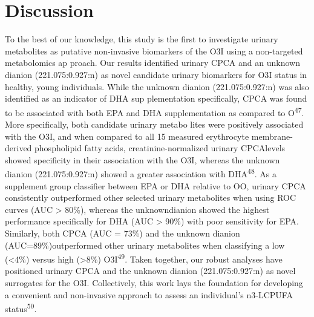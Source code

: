\documentclass[journal=jacsat,manuscript=article]{achemso}
\begin{document}
\section{Discussion}\label{discussion}

To the best of our knowledge, this study is the first to investigate
urinary metabolites as putative non-invasive biomarkers of the O3I using
a non-targeted metabolomics ap proach. Our results identified urinary
CPCA and an unknown dianion (221.075:0.927:n) as novel candidate urinary
biomarkers for O3I status in healthy, young individuals. While the
unknown dianion (221.075:0.927:n) was also identified as an indicator of
DHA sup plementation specifically, CPCA was found to be associated with
both EPA and DHA supplementation as compared to O\textsuperscript{47}.
More specifically, both candidate urinary metabo lites were positively
associated with the O3I, and when compared to all 15 measured
erythrocyte membrane-derived phospholipid fatty acids,
creatinine-normalized urinary CPCAlevels showed specificity in their
association with the O3I, whereas the unknown dianion (221.075:0.927:n)
showed a greater association with DHA\textsuperscript{48}. As a
supplement group classifier between EPA or DHA relative to OO, urinary
CPCA consistently outperformed other selected urinary metabolites when
using ROC curves (AUC \textgreater{} 80\%), whereas the unknowndianion
showed the highest performance specifically for DHA (AUC \textgreater{}
90\%) with poor sensitivity for EPA. Similarly, both CPCA (AUC = 73\%)
and the unknown dianion (AUC=89\%)outperformed other urinary metabolites
when classifying a low (\textless4\%) versus high (\textgreater8\%)
O3I\textsuperscript{49}. Taken together, our robust analyses have
positioned urinary CPCA and the unknown dianion (221.075:0.927:n) as
novel surrogates for the O3I. Collectively, this work lays the
foundation for developing a convenient and non-invasive approach to
assess an individual's n3-LCPUFA status\textsuperscript{50}.
\end{document}
